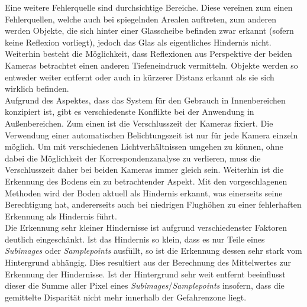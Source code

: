 \noindent
Eine weitere Fehlerquelle sind durchsichtige Bereiche. Diese vereinen zum einen Fehlerquellen, welche auch bei spiegelnden Arealen auftreten, zum anderen werden Objekte, die sich hinter einer Glasscheibe befinden zwar erkannt (sofern keine Reflexion vorliegt), jedoch das Glas als eigentliches Hindernis nicht. Weiterhin besteht die Möglichkeit, dass Reflexionen aus Perspektive der beiden Kameras betrachtet einen anderen Tiefeneindruck vermitteln. Objekte werden so entweder weiter entfernt oder auch in kürzerer Distanz erkannt als sie sich wirklich befinden.\\

\noindent
Aufgrund des Aspektes, dass das System für den Gebrauch in Innenbereichen konzipiert ist, gibt es verschiedenste Konflikte bei der Anwendung in Außenbereichen. Zum einen ist die Verschlusszeit der Kameras fixiert. Die Verwendung einer automatischen Belichtungszeit ist nur für jede Kamera einzeln möglich. Um mit verschiedenen Lichtverhältnissen umgehen zu können, ohne dabei die Möglichkeit der Korrespondenzanalyse zu verlieren, muss die Verschlusszeit daher bei beiden Kameras immer gleich sein. Weiterhin ist die Erkennung des Bodens ein zu betrachtender Aspekt. Mit den vorgeschlagenen Methoden wird der Boden aktuell als Hindernis erkannt, was einerseits seine Berechtigung hat, andererseits auch bei niedrigen Flughöhen zu einer fehlerhaften Erkennung als Hindernis führt.\\

\noindent
Die Erkennung sehr kleiner Hindernisse ist aufgrund verschiedenster Faktoren deutlich eingeschänkt. Ist das Hindernis so klein, dass es nur Teile eines \emph{Subimages} oder \emph{Samplepoints} ausfüllt, so ist die Erkennung dessen sehr stark vom Hintergrund abhängig. Dies resultiert aus der Berechnung des Mittelwertes zur Erkennung der Hindernisse. Ist der Hintergrund sehr weit entfernt beeinflusst dieser die Summe aller Pixel eines \emph{Subimages}/\emph{Samplepoints} insofern, dass die gemittelte Disparität nicht mehr innerhalb der Gefahrenzone liegt. 


